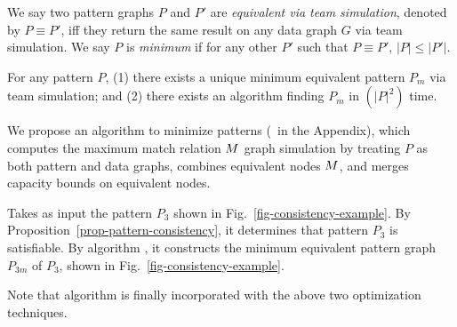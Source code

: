 {%


We say two pattern graphs $P$ and $P'$ are {\em equivalent via team simulation}, denoted by $P\equiv P'$, iff they return the same result on any data graph $G$ via team simulation. We say $P$ is {\em minimum} if for any other $P'$ such that $P\equiv P'$, $|P|\leq |P'|$.


\begin{theorem}
\label{thm-pattern-minimization}
For any pattern $P$, (1) there exists a unique minimum equivalent pattern $P_m$ via team simulation;
and (2) there exists an algorithm finding $P_m$ in $(|P|^2)$ time.
\end{theorem}


We propose an algorithm to minimize patterns (\ie\ \minp in the Appendix), which
 computes the maximum match relation $M$ \wrt graph simulation by treating $P$ as both pattern and data graphs,
combines equivalent nodes \wrt $M$, and merges capacity bounds on equivalent nodes.


\begin{example}
Takes as input the pattern $P_3$ shown in Fig.~\ref{fig-consistency-example}.
By Proposition~\ref{prop-pattern-consistency}, it determines that pattern $P_3$ is satisfiable.
By algorithm \minp, it constructs the minimum equivalent pattern graph $P_{3m}$ of $P_3$, shown in Fig.~\ref{fig-consistency-example}.
\end{example}


Note that algorithm \grouprec is finally incorporated with the above two optimization techniques.
}%



